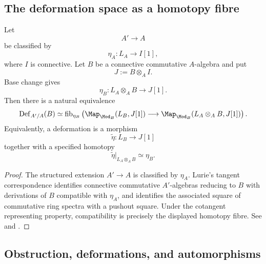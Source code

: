 \subsection{The deformation space as a homotopy fibre}

\begin{theorem}
\label{thm:affine-deformation-homotopy-fibre}
Let
\[
    A'
    \longrightarrow
    A
\]
be classified by
\[
    \eta_A
    \colon
    L_A
    \longrightarrow
    I[1],
\]
where $I$ is connective. Let $B$ be a connective commutative $A$-algebra
and put
\[
    J
    :=
    B\otimes_AI.
\]
Base change gives
\[
    \eta_B
    \colon
    L_A\otimes_AB
    \longrightarrow
    J[1].
\]
Then there is a natural equivalence
\[
    \operatorname{Def}_{A'/A}(B)
    \simeq
    \operatorname{fib}_{\eta_B}
    \left(
        \Map_{\Mod_B}(L_B,J[1])
        \longrightarrow
        \Map_{\Mod_B}(L_A\otimes_AB,J[1])
    \right).
\]
Equivalently, a deformation is a morphism
\[
    \widetilde\eta
    \colon
    L_B
    \longrightarrow
    J[1]
\]
together with a specified homotopy
\[
    \widetilde\eta|_{L_A\otimes_AB}
    \simeq
    \eta_B.
\]
\end{theorem}

\begin{proof}
The structured extension $A'\to A$ is classified by $\eta_A$.
Lurie's tangent correspondence identifies connective commutative
$A'$-algebras reducing to $B$ with derivations of $B$ compatible with
$\eta_A$, and identifies the associated square of commutative ring
spectra with a pushout square. Under the cotangent representing property,
compatibility is precisely the displayed homotopy fibre. See
\cite[Proposition~3.22 and Theorem~3.25]{LurieDAGIV} and
\cite[Section~7.4.2]{LurieHigherAlgebra}.
\end{proof}

\subsection{Obstruction, deformations, and automorphisms}

